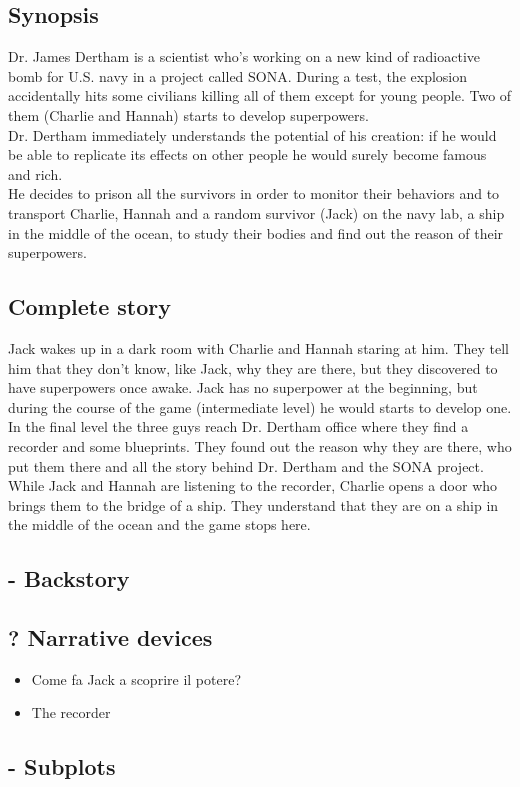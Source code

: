 \subsection{Synopsis}
Dr. James Dertham is a scientist who's working on a new kind of radioactive bomb for U.S. navy in a project called SONA. During a test, the explosion accidentally hits some civilians killing all of them except for young people. Two of them (Charlie and Hannah) starts to develop superpowers. \\
Dr. Dertham immediately understands the potential of his creation: if he would be able to replicate its effects on other people he would surely become famous and rich. \\
He decides to prison all the survivors in order to monitor their behaviors and to transport Charlie, Hannah and a random survivor (Jack) on the navy lab, a ship in the middle of the ocean, to study their bodies and find out the reason of their superpowers.

\subsection{Complete story}
Jack wakes up in a dark room with Charlie and Hannah staring at him. They tell him that they don't know, like Jack, why they are there, but they discovered to have superpowers once awake. Jack has no superpower at the beginning, but during the course of the game (intermediate level) he would starts to develop one.
In the final level the three guys reach Dr. Dertham office where they find a recorder and some blueprints. They found out the reason why they are there, who put them there and all the story behind Dr. Dertham and the SONA project.
While Jack and Hannah are listening to the recorder, Charlie opens a door who brings them to the bridge of a ship. They understand that they are on a ship in the middle of the ocean and the game stops here.

\subsection{- Backstory}

\subsection{? Narrative devices}
\begin{itemize}  
\item Come fa Jack a scoprire il potere?
\item The recorder 
\end{itemize}

\subsection{- Subplots}